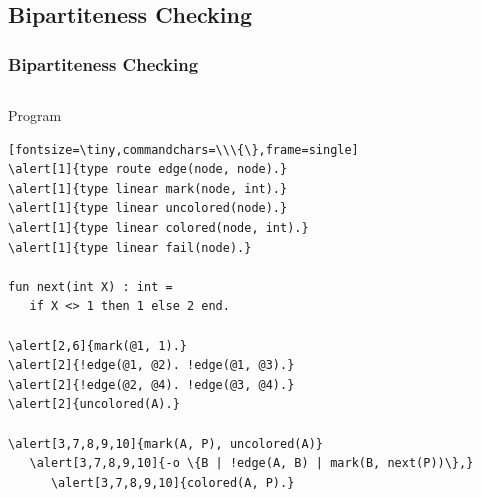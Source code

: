 \documentclass{beamer}
\let\oldalert\alert
\renewcommand{\alert}[2][]{%
  \if\relax\detokenize{#1}\relax%
    \oldalert{#2}%
  \else
    \oldalert<#1>{#2}%
  \fi}
\begin{document}
\subsection{Bipartiteness Checking}

\begin{frame}[fragile]
  \frametitle{Bipartiteness Checking}
  \begin{columns}[t]
     \begin{block}{Program}
       \begin{verbatim}[fontsize=\tiny,commandchars=\\\{\},frame=single]
\alert[1]{type route edge(node, node).}
\alert[1]{type linear mark(node, int).}
\alert[1]{type linear uncolored(node).}
\alert[1]{type linear colored(node, int).}
\alert[1]{type linear fail(node).}

fun next(int X) : int =
   if X <> 1 then 1 else 2 end.

\alert[2,6]{mark(@1, 1).}
\alert[2]{!edge(@1, @2). !edge(@1, @3).}
\alert[2]{!edge(@2, @4). !edge(@3, @4).}
\alert[2]{uncolored(A).}

\alert[3,7,8,9,10]{mark(A, P), uncolored(A)}
   \alert[3,7,8,9,10]{-o \{B | !edge(A, B) | mark(B, next(P))\},}
      \alert[3,7,8,9,10]{colored(A, P).}


\end{verbatim}
\end{block}
\end{columns}
\end{frame}
\end{document}
